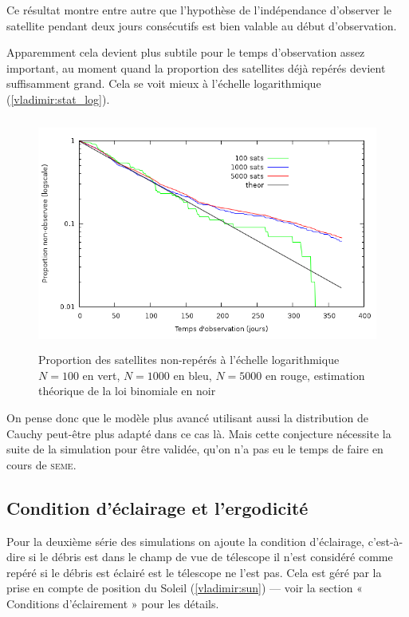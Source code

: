 Ce r\'esultat montre entre autre que l'hypoth\`ese de l'ind\'ependance 
d'observer le satellite pendant deux jours cons\'ecutifs est 
bien valable au d\'ebut d'observation. 

Apparemment cela devient plus subtile pour le temps d'observation assez important, 
au moment quand la proportion des satellites d\'ej\`a rep\'er\'es devient suffisamment grand.
Cela se voit mieux \`a l'\'echelle logarithmique (\autoref{vladimir:stat_log}).

\begin{figure}[ht] \centering
      \includegraphics*[height=3in]{stat_log.png}
      \caption{
            \label{vladimir:stat_log}
  Proportion des satellites non-rep\'er\'es \`a l'\'echelle logarithmique $N = 100$ en vert, $N = 1000$ en bleu, $N = 5000$ en rouge, estimation th\'eorique
  de la loi binomiale en noir}
 \end{figure}

On pense donc que le mod\`ele plus avanc\'e utilisant aussi la distribution de Cauchy 
peut-\^etre plus adapt\'e dans ce cas l\`a. Mais cette conjecture n\'ecessite la suite de la simulation pour 
\^etre valid\'ee, qu'on n'a pas eu le temps de faire en cours de \textsc{seme}.  
  
\subsection{Condition d'\'eclairage et l'ergodicit\'e}  
Pour la deuxi\`eme s\'erie des simulations on ajoute la condition d'\'eclairage, c'est-\`a-dire 
si le d\'ebris est dans le champ de vue de t\'elescope il n'est consid\'er\'e comme rep\'er\'e
si le d\'ebris est \'eclair\'e est le t\'elescope ne l'est pas. Cela est g\'er\'e par la prise 
en compte de position du Soleil (\autoref{vladimir:sun}) --- voir la section 
« Conditions d'\'eclairement » pour les d\'etails. 

